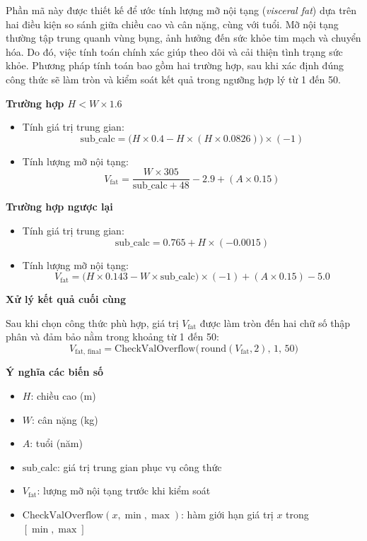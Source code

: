 Phần mã này được thiết kế để ước tính lượng mỡ nội tạng (\emph{visceral fat}) dựa trên hai điều kiện so sánh giữa chiều cao và cân nặng, cùng với tuổi. Mỡ nội tạng thường tập trung quanh vùng bụng, ảnh hưởng đến sức khỏe tim mạch và chuyển hóa. Do đó, việc tính toán chính xác giúp theo dõi và cải thiện tình trạng sức khỏe. Phương pháp tính toán bao gồm hai trường hợp, sau khi xác định đúng công thức sẽ làm tròn và kiểm soát kết quả trong ngưỡng hợp lý từ 1 đến 50.

\textbf{Trường hợp \(H < W \times 1.6\)}
\begin{itemize}
    \item Tính giá trị trung gian:
    \[
      \text{sub\_calc} = \bigl(H \times 0.4 - H \times (H \times 0.0826)\bigr)\times(-1)
    \]
    \item Tính lượng mỡ nội tạng:
    \[
      V_{\text{fat}} = \frac{W \times 305}{\text{sub\_calc} + 48} - 2.9 + (A \times 0.15)
    \]
\end{itemize}

\textbf{Trường hợp ngược lại}
\begin{itemize}
    \item Tính giá trị trung gian:
    \[
      \text{sub\_calc} = 0.765 + H \times (-0.0015)
    \]
    \item Tính lượng mỡ nội tạng:
    \[
      V_{\text{fat}} = \bigl(H \times 0.143 - W \times \text{sub\_calc}\bigr)\times(-1) + (A \times 0.15) - 5.0
    \]
\end{itemize}

\textbf{Xử lý kết quả cuối cùng}

Sau khi chọn công thức phù hợp, giá trị \(V_{\text{fat}}\) được làm tròn đến hai chữ số thập phân và đảm bảo nằm trong khoảng từ 1 đến 50:
\[
  V_{\text{fat, final}} = \text{CheckValOverflow}\bigl(\,\text{round}(V_{\text{fat}},2),\,1,\,50\bigr)
\]

\textbf{Ý nghĩa các biến số}
\begin{itemize}
  \item \(H\): chiều cao (m)  
  \item \(W\): cân nặng (kg)  
  \item \(A\): tuổi (năm)  
  \item \(\text{sub\_calc}\): giá trị trung gian phục vụ công thức  
  \item \(V_{\text{fat}}\): lượng mỡ nội tạng trước khi kiểm soát  
  \item \(\text{CheckValOverflow}(x,\min,\max)\): hàm giới hạn giá trị \(x\) trong \([\min,\max]\)
\end{itemize}

